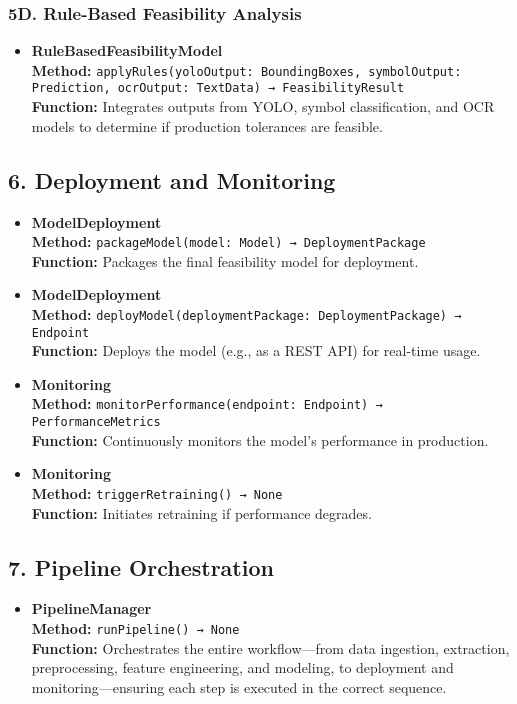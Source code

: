 \documentclass{article}
\begin{document}
\subsubsection{5D. Rule-Based Feasibility Analysis}
\begin{itemize}
    \item \textbf{RuleBasedFeasibilityModel} \\
    \textbf{Method:} \verb|applyRules(yoloOutput: BoundingBoxes, symbolOutput: Prediction, ocrOutput: TextData) → FeasibilityResult| \\
    \textbf{Function:} Integrates outputs from YOLO, symbol classification, and OCR models to determine if production tolerances are feasible.
\end{itemize}

\subsection{6. Deployment and Monitoring}
\begin{itemize}
    \item \textbf{ModelDeployment} \\
    \textbf{Method:} \verb|packageModel(model: Model) → DeploymentPackage| \\
    \textbf{Function:} Packages the final feasibility model for deployment.
    
    \item \textbf{ModelDeployment} \\
    \textbf{Method:} \verb|deployModel(deploymentPackage: DeploymentPackage) → Endpoint| \\
    \textbf{Function:} Deploys the model (e.g., as a REST API) for real-time usage.
    
    \item \textbf{Monitoring} \\
    \textbf{Method:} \verb|monitorPerformance(endpoint: Endpoint) → PerformanceMetrics| \\
    \textbf{Function:} Continuously monitors the model's performance in production.
    
    \item \textbf{Monitoring} \\
    \textbf{Method:} \verb|triggerRetraining() → None| \\
    \textbf{Function:} Initiates retraining if performance degrades.
\end{itemize}

\subsection{7. Pipeline Orchestration}
\begin{itemize}
    \item \textbf{PipelineManager} \\
    \textbf{Method:} \verb|runPipeline() → None| \\
    \textbf{Function:} Orchestrates the entire workflow---from data ingestion, extraction, preprocessing, feature engineering, and modeling, to deployment and monitoring---ensuring each step is executed in the correct sequence.
\end{itemize}
\end{document}
